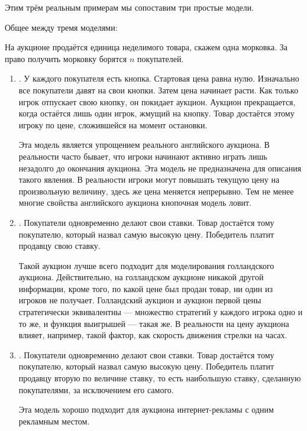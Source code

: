 \begin{itemize}
\end{itemize}

Этим трём реальным примерам мы сопоставим три простые модели.


Общее между тремя моделями:

На аукционе продаётся единица неделимого товара, скажем одна морковка. За право получить морковку борятся $n$ покупателей.




\begin{enumerate}
\item {}. У каждого покупателя есть кнопка. Стартовая цена равна нулю. Изначально все покупатели давят на свои кнопки. Затем цена начинает расти. Как только игрок отпускает свою кнопку, он покидает аукцион. Аукцион прекращается, когда остаётся лишь один игрок, жмущий на кнопку. Товар достаётся этому игроку по цене, сложившейся на момент остановки.

Эта модель является упрощением реального английского аукциона. В реальности часто бывает, что игроки начинают активно играть лишь незадолго до окончания аукциона. Эта модель не предназначена для описания такого явления. В реальности игроки могут повышать текущую цену на произвольную величину, здесь же цена меняется непрерывно. Тем не менее многие свойства английского аукциона кнопочная модель ловит.

\item {}. Покупатели одновременно делают свои ставки. Товар достаётся тому покупателю, который назвал самую высокую цену. Победитель платит продавцу свою ставку.

Такой аукцион лучше всего подходит для моделирования голландского аукциона. Действительно, на голландском аукционе никакой другой информации, кроме того, по какой цене был продан товар, ни один из игроков не получает. Голландский аукцион и аукцион первой цены стратегически эквивалентны — множество стратегий у каждого игрока одно и то же, и функция выигрышей — такая же. В реальности на цену аукциона влияет, например, такой фактор, как скорость движения стрелки на часах.

\item {}. Покупатели одновременно делают свои ставки. Товар достаётся тому покупателю, который назвал самую высокую цену. Победитель платит продавцу вторую по величине ставку, то есть наибольшую ставку, сделанную покупателями, за исключением его самого.

Эта модель хорошо подходит для аукциона интернет-рекламы с одним рекламным местом.
\end{enumerate}

